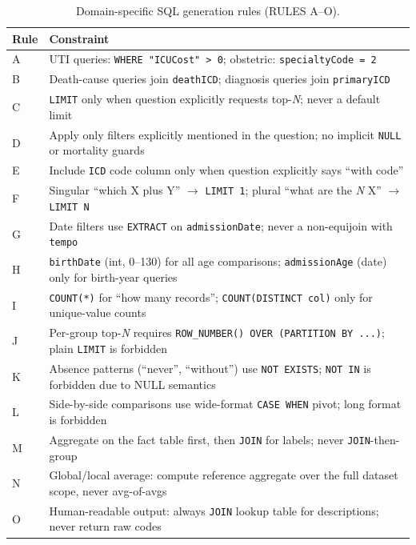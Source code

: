 \documentclass[conference]{IEEEtran}
\begin{document}
\begin{table}[!t]
\centering
\caption{Domain-specific SQL generation rules (RULES A--O).}
\label{tab:rules}
\renewcommand{\arraystretch}{1.1}
\begin{tabular}{@{}lp{6.2cm}@{}}
\hline
\textbf{Rule} & \textbf{Constraint} \\
\hline
A & UTI queries: \texttt{WHERE "ICUCost" > 0}; obstetric: \texttt{specialtyCode = 2} \\
B & Death-cause queries join \texttt{deathICD}; diagnosis queries join \texttt{primaryICD} \\
C & \texttt{LIMIT} only when question explicitly requests top-\textit{N}; never a default limit \\
D & Apply only filters explicitly mentioned in the question; no implicit \texttt{NULL} or mortality guards \\
E & Include \texttt{ICD} code column only when question explicitly says ``with code'' \\
F & Singular ``which X plus Y'' $\to$ \texttt{LIMIT 1}; plural ``what are the \textit{N} X'' $\to$ \texttt{LIMIT N} \\
G & Date filters use \texttt{EXTRACT} on \texttt{admissionDate}; never a non-equijoin with \texttt{tempo} \\
H & \texttt{birthDate} (int, 0--130) for all age comparisons; \texttt{admissionAge} (date) only for birth-year queries \\
I & \texttt{COUNT(*)} for ``how many records''; \texttt{COUNT(DISTINCT col)} only for unique-value counts \\
J & Per-group top-\textit{N} requires \texttt{ROW\_NUMBER() OVER (PARTITION BY ...)}; plain \texttt{LIMIT} is forbidden \\
K & Absence patterns (``never'', ``without'') use \texttt{NOT EXISTS}; \texttt{NOT IN} is forbidden due to NULL semantics \\
L & Side-by-side comparisons use wide-format \texttt{CASE WHEN} pivot; long format is forbidden \\
M & Aggregate on the fact table first, then \texttt{JOIN} for labels; never \texttt{JOIN}-then-group \\
N & Global/local average: compute reference aggregate over the full dataset scope, never avg-of-avgs \\
O & Human-readable output: always \texttt{JOIN} lookup table for descriptions; never return raw codes \\
\hline
\end{tabular}
\end{table}
\end{document}

